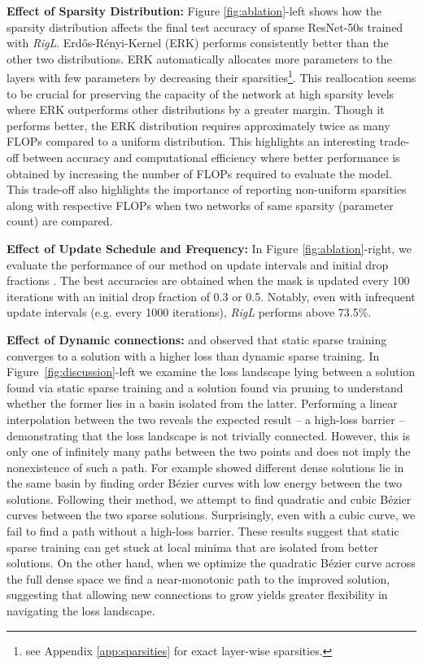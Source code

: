 \documentclass{article}
\begin{document}
\textbf{Effect of Sparsity Distribution:}
Figure \ref{fig:ablation}-left shows how the sparsity distribution affects the final test accuracy of sparse ResNet-50s trained with {\em RigL}. Erdős-Rényi-Kernel (ERK) performs consistently better than the other two distributions. ERK automatically allocates more parameters to the layers with few parameters by decreasing their sparsities\footnote{see Appendix \ref{app:sparsities} for exact layer-wise sparsities.}. This reallocation seems to be crucial for preserving the capacity of the network at high sparsity levels where ERK outperforms other distributions by a greater margin. Though it performs better, the ERK distribution requires approximately twice as many FLOPs compared to a uniform distribution. This highlights an interesting trade-off between accuracy and computational efficiency where better performance is obtained by increasing the number of FLOPs required to evaluate the model. This trade-off also highlights the importance of reporting non-uniform sparsities along with respective FLOPs when two networks of same sparsity (parameter count)  are compared.



\textbf{Effect of Update Schedule and Frequency:}
In Figure \ref{fig:ablation}-right, we evaluate the performance of our method on update intervals  and initial drop fractions . The best accuracies are obtained when the mask is updated every 100 iterations with an initial drop fraction of 0.3 or 0.5. Notably, even with infrequent update intervals (e.g. every 1000 iterations), \textit{RigL} performs above 73.5\%.






\textbf{Effect of Dynamic connections:}
\citet{frankle2019} and \citet{Mostafa2019} observed that static sparse training converges to a solution with a higher loss than dynamic sparse training. In Figure~\ref{fig:discussion}-left we examine the loss landscape lying between a solution found via static sparse training and a solution found via pruning to understand whether the former lies in a basin isolated from the latter. Performing a linear interpolation between the two reveals the expected result -- a high-loss barrier -- demonstrating that the loss landscape is not trivially connected. However, this is only one of infinitely many paths between the two points \citep{Garipov2018, Draxler2018} and does not imply the nonexistence of such a path. For example \citet{Garipov2018} showed different dense solutions lie in the same basin by finding  order B\'ezier curves with low energy between the two solutions. Following their method, we attempt to find quadratic and cubic B\'ezier curves between the two sparse solutions. Surprisingly, even with a cubic curve, we fail to find a path without a high-loss barrier. These results suggest that static sparse training can get stuck at local minima that are isolated from better solutions. On the other hand, when we optimize the quadratic B\'ezier curve across the full dense space we find a near-monotonic path to the improved solution, suggesting that allowing new connections to grow yields greater flexibility in navigating the loss landscape.
\end{document}
